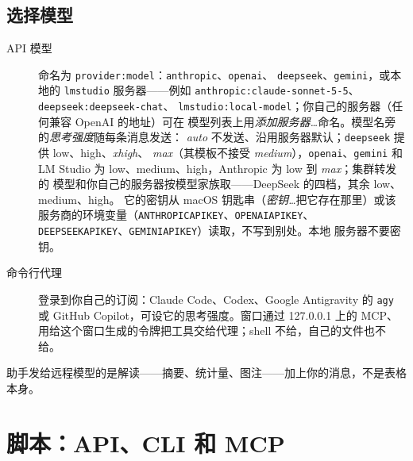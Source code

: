 \documentclass[11pt]{ctexrep}
\newcommand{\codeunderscore}{\textunderscore\allowbreak}
\newcommand{\code}[1]{\texttt{\let\_\codeunderscore #1}}
\begin{document}
\section{选择模型}
\begin{description}
  \item[API 模型] 命名为 \code{provider:model}：\code{anthropic}、\code{openai}、
        \code{deepseek}、\code{gemini}，或本地的 \code{lmstudio} 服务器——例如
        \code{anthropic:claude-sonnet-5-5}、\code{deepseek:deepseek-chat}、
        \code{lmstudio:local-model}；你自己的服务器（任何兼容 OpenAI 的地址）可在
        模型列表上用\emph{添加服务器…}命名。模型名旁的\emph{思考强度}随每条消息发送：
        \emph{auto} 不发送、沿用服务器默认；\code{deepseek} 提供 low、high、\emph{xhigh}、
        \emph{max}（其模板不接受 \emph{medium}），\code{openai}、\code{gemini} 和
        LM Studio 为 low、medium、high，Anthropic 为 low 到 \emph{max}；集群转发的
        模型和你自己的服务器按模型家族取——DeepSeek 的四档，其余 low、medium、high。
        它的密钥从 macOS 钥匙串（\emph{密钥…}把它存在那里）或该
        服务商的环境变量（\code{ANTHROPIC\_API\_KEY}、\code{OPENAI\_API\_KEY}、
        \code{DEEPSEEK\_API\_KEY}、\code{GEMINI\_API\_KEY}）读取，不写到别处。本地
        服务器不要密钥。
  \item[命令行代理] 登录到你自己的订阅：Claude Code、Codex、Google Antigravity 的
        \code{agy} 或 GitHub Copilot，可设它的思考强度。窗口通过 127.0.0.1 上的 MCP、
        用给这个窗口生成的令牌把工具交给代理；shell 不给，自己的文件也不给。
\end{description}
助手发给远程模型的是解读——摘要、统计量、图注——加上你的消息，不是表格本身。

\chapter{脚本：API、CLI 和 MCP}\label{ch:script}
\end{document}
